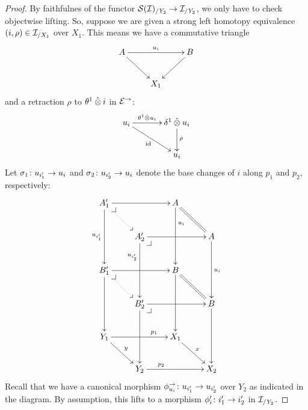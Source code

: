 \documentclass[reqno,10pt,a4paper,oneside,draft]{amsart}
\begin{document}
\begin{proof}
By faithfulnes of the functor $\cal{S}(\cal{I})_{/Y_2} \to \cal{I}_{/Y_2}$, we only have to check objectwise lifting.
So, suppose we are given a strong left homotopy equivalence $(i, \rho) \in \cal{I}_{/X_1}$ over $X_1$.
This means we have a commutative triangle
\[
\xymatrix{
  A
  \ar[rr]^{u_i}
  \ar[dr]
&&
  B
  \ar[dl]
\\&
  X_1
}
\]
and a retraction $\rho$ to $\thetal \hatotimes i$ in $\catE^\to$:
\[
\xymatrix@C+1em{
  u_i
  \ar[r]^-{\thetal \hatotimes u_i}
  \ar[dr]_{\id}
&
  \rcyl \hatotimes u_i \ar[d]^{\rho}
\\&
  u_i
}
\]
Let $\sigma_1 \co u_{i_1'} \to u_i$ and $\sigma_2 \co u_{i_2'} \to u_i$ denote the base changes of $i$ along $p_1$ and $p_2$, respectively:
\[
\xymatrix{
  A_1'
  \ar[rr]
  \ar[dd]_{u_{i_1'}}
  \pullback{dr}
  \ar@{.>}[dr]
&&
  A
  \ar[dd]^(0.3){u_i}
  \ar@{=}[dr]
\\&
  A_2'
  \ar[rr]
  \ar[dd]_(0.3){u_{i_2'}}
  \pullback{dr}
&&
  A
  \ar[dd]^{u_i}
\\
  B_1'
  \ar[rr]
  \ar[dd]
  \pullback{dr}
  \ar@{.>}[dr]
&&
  B
  \ar[dd]
  \ar@{=}[dr]
\\&
  B_2'
  \ar[rr]
  \ar[dd]
  \pullback{dr}
&&
  B
  \ar[dd]
\\
  Y_1
  \ar[rr]^(0.7){p_1}
  \ar[dr]^{y}
&&
  X_1
  \ar[dr]^{x}
\\&
  Y_2
  \ar[rr]^(0.3){p_2}
&&
  X_2
}
\]
Recall that we have a canonical morphism $\phi_{u_i}^\to \co u_{i_1'} \to u_{i_2'}$ over $Y_2$ as indicated in the diagram.
By assumption, this lifts to a morphism $\phi_i' \co i_1' \to i_2'$ in $\cal{I}_{/Y_2}$.


\end{proof}
\end{document}
